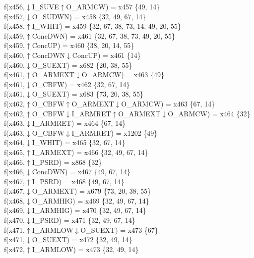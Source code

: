 f(x456,$\downarrow$I\_SUVE$\uparrow$O\_ARMCW) = x457 \{49, 14\} \\  
f(x457,$\downarrow$O\_SUDWN) = x458 \{32, 49, 67, 14\} \\  
f(x458,$\uparrow$I\_WHIT) = x459 \{32, 67, 38, 73, 14, 49, 20, 55\} \\  
f(x459,$\uparrow$ConcDWN) = x461 \{32, 67, 38, 73, 49, 20, 55\} \\  
f(x459,$\uparrow$ConcUP) = x460 \{38, 20, 14, 55\} \\  
f(x460,$\uparrow$ConcDWN$\downarrow$ConcUP) = x461 \{14\} \\  
f(x460,$\downarrow$O\_SUEXT) = x682 \{20, 38, 55\} \\  
f(x461,$\uparrow$O\_ARMEXT$\downarrow$O\_ARMCW) = x463 \{49\} \\  
f(x461,$\downarrow$O\_CBFW) = x462 \{32, 67, 14\} \\  
f(x461,$\downarrow$O\_SUEXT) = x683 \{73, 20, 38, 55\} \\  
f(x462,$\uparrow$O\_CBFW$\uparrow$O\_ARMEXT$\downarrow$O\_ARMCW) = x463 \{67, 14\} \\  
f(x462,$\uparrow$O\_CBFW$\downarrow$I\_ARMRET$\uparrow$O\_ARMEXT$\downarrow$O\_ARMCW) = x464 \{32\} \\  
f(x463,$\downarrow$I\_ARMRET) = x464 \{67, 14\} \\  
f(x463,$\downarrow$O\_CBFW$\downarrow$I\_ARMRET) = x1202 \{49\} \\  
f(x464,$\downarrow$I\_WHIT) = x465 \{32, 67, 14\} \\  
f(x465,$\uparrow$I\_ARMEXT) = x466 \{32, 49, 67, 14\} \\  
f(x466,$\uparrow$I\_PSRD) = x868 \{32\} \\  
f(x466,$\downarrow$ConcDWN) = x467 \{49, 67, 14\} \\  
f(x467,$\uparrow$I\_PSRD) = x468 \{49, 67, 14\} \\  
f(x467,$\downarrow$O\_ARMEXT) = x679 \{73, 20, 38, 55\} \\  
f(x468,$\downarrow$O\_ARMHIG) = x469 \{32, 49, 67, 14\} \\  
f(x469,$\downarrow$I\_ARMHIG) = x470 \{32, 49, 67, 14\} \\  
f(x470,$\downarrow$I\_PSRD) = x471 \{32, 49, 67, 14\} \\  
f(x471,$\uparrow$I\_ARMLOW$\downarrow$O\_SUEXT) = x473 \{67\} \\  
f(x471,$\downarrow$O\_SUEXT) = x472 \{32, 49, 14\} \\  
f(x472,$\uparrow$I\_ARMLOW) = x473 \{32, 49, 14\} \\  
